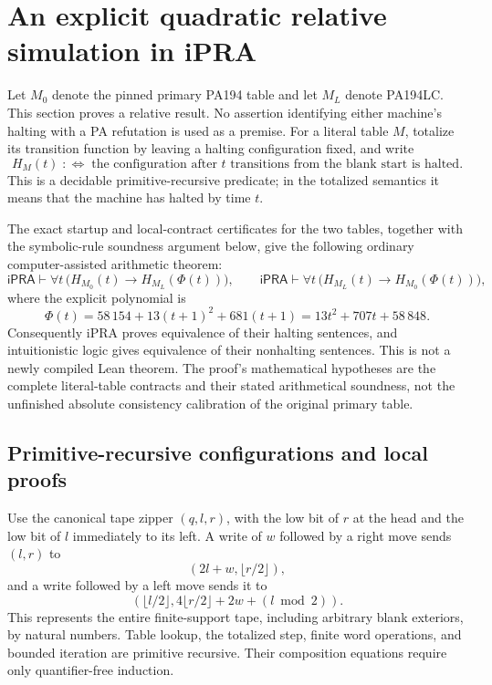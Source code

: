 \section{An explicit quadratic relative simulation in iPRA}
\label{sec:quadratic-transfer}

Let $M_0$ denote the pinned primary PA194 table and let $M_L$ denote
PA194LC.  This section proves a relative result.  No assertion identifying
either machine's halting with a PA refutation is used as a premise.
For a literal table $M$, totalize its transition function by leaving a
halting configuration fixed, and write
\[
 H_M(t)\;:\!\iff\;
 \text{the configuration after $t$ transitions from the blank start is halted}.
\]
This is a decidable primitive-recursive predicate; in the totalized
semantics it means that the machine has halted by time $t$.

The exact startup and local-contract certificates for the two tables,
together with the symbolic-rule soundness argument below, give the
following ordinary computer-assisted arithmetic theorem:
\[
 \mathsf{iPRA}\vdash\forall t\,
 \bigl(H_{M_0}(t)\longrightarrow H_{M_L}(\Phi(t))\bigr),
 \qquad
 \mathsf{iPRA}\vdash\forall t\,
 \bigl(H_{M_L}(t)\longrightarrow H_{M_0}(\Phi(t))\bigr),
 \tag{Q}\label{eq:quadratic-transfer}
\]
where the explicit polynomial is
\[
 \boxed{\Phi(t)=58\,154+13(t+1)^2+681(t+1)
              =13t^2+707t+58\,848.}
\]
Consequently iPRA proves equivalence of their halting sentences, and
intuitionistic logic gives equivalence of their nonhalting sentences.
This is not a newly compiled Lean theorem.  The proof's mathematical
hypotheses are the complete literal-table contracts and their stated
arithmetical soundness, not the unfinished absolute consistency
calibration of the original primary table.

\subsection{Primitive-recursive configurations and local proofs}

Use the canonical tape zipper $(q,l,r)$, with the low bit of $r$ at the
head and the low bit of $l$ immediately to its left.  A write of $w$ followed
by a right move sends $(l,r)$ to
\[
 (2l+w,\lfloor r/2\rfloor),
\]
and a write followed by a left move sends it to
\[
 (\lfloor l/2\rfloor,
   4\lfloor r/2\rfloor+2w+(l\bmod 2)).
\]
This represents the entire finite-support tape, including arbitrary blank
exteriors, by natural numbers.  Table lookup, the totalized step, finite
word operations, and bounded iteration are primitive recursive.  Their
composition equations require only quantifier-free induction.

